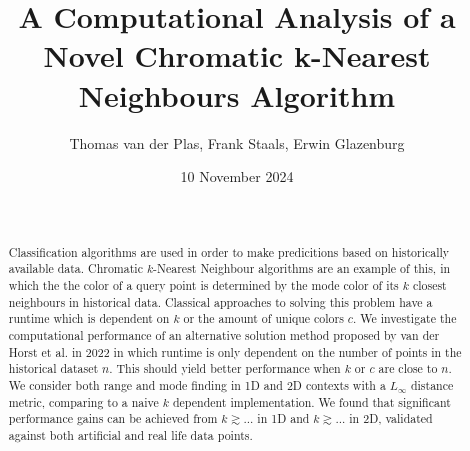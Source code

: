 \documentclass{article}
\title{A Computational Analysis of a Novel Chromatic k-Nearest Neighbours Algorithm}
\author{Thomas van der Plas, Frank Staals, Erwin Glazenburg}
\date{10 November 2024}
\newcommand{\todo}[1]{{\color{red}[#1]}}
\newcommand{\fb}[1]{{\color{blue}#1}}
\begin{document}
\maketitle

\begin{abstract}
    \noindent \todo{TODO: cijfers} \\\\
    \fb{Classification algorithms are used in order to make predicitions based on historically available data. Chromatic $k$-Nearest Neighbour algorithms are an example of this, in which the} the color of a query point is determined by the mode color of its $k$ closest neighbours \fb{in historical data}. Classical approaches to solving this problem have a runtime which is dependent on $k$ or the amount of unique colors $c$. \fb{We investigate the computational performance of an alternative solution method proposed by van der Horst et al. in 2022 in which runtime is only dependent on the number of points in the historical dataset $n$. This should yield better performance when $k$ or $c$ are close to $n$.}\\
    We consider both range and mode finding in 1D and 2D contexts with a $L_\infty$ distance metric, comparing to a naive $k$ dependent implementation. We found that significant performance gains can be achieved from $k \gtrsim ...$ in 1D and $k \gtrsim ...$ in 2D, validated against both artificial and real life data points.
\end{abstract}
\end{document}
